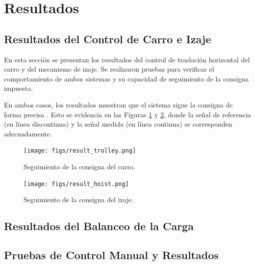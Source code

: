 \documentclass{article}
\begin{document}
            \section{Resultados}\label{sec:results}

            \subsection{Resultados del Control de Carro e Izaje}
            En esta sección se presentan los resultados del control de traslación horizontal del carro y del mecanismo de izaje. Se realizaron pruebas para verificar el comportamiento de ambos sistemas y su capacidad de seguimiento de la consigna impuesta.

            En ambos casos, los resultados muestran que el sistema sigue la consigna de forma precisa . Esto se evidencia en las Figuras \ref{fig:result_trolley} y \ref{fig:result_hoist}, donde la señal de referencia (en línea discontinua) y la señal medida (en línea continua) se corresponden adecuadamente.

            \begin{figure} [H]
            \centering
            \texttt{[image: figs/result\_trolley.png]}
            \caption{Seguimiento de la consigna del carro. }
            \label{fig:result_trolley}
            \end{figure}

            \begin{figure} [H]
            \centering
            \texttt{[image: figs/result\_hoist.png]}
            \caption{Seguimiento de la consigna del izaje. }
            \label{fig:result_hoist}
            \end{figure}

            
            \subsection{Resultados del Balanceo de la Carga}


            
            
            \subsection{Pruebas de Control Manual y Resultados}
            
\end{document}

